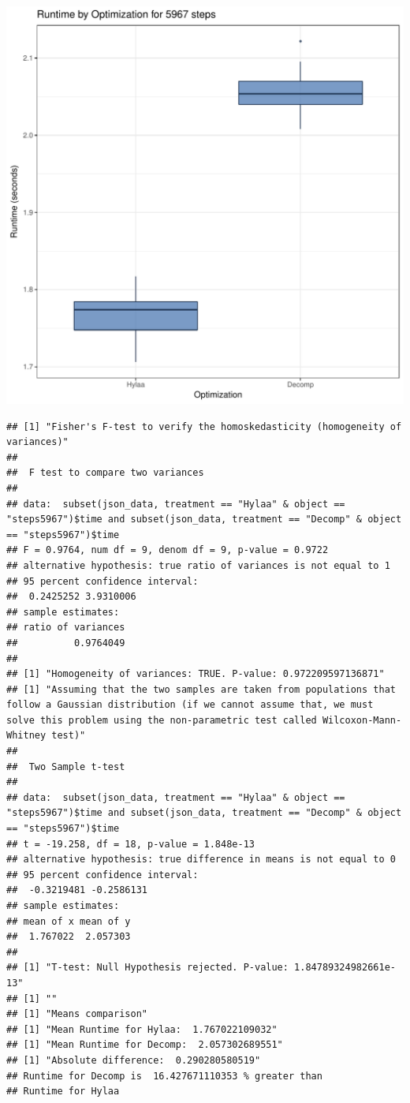 \documentclass{article}\usepackage[]{graphicx}\usepackage[]{color}
\makeatletter
\def\maxwidth{ %
  \ifdim\Gin@nat@width>\linewidth
    \linewidth
  \else
    \Gin@nat@width
  \fi
}
\newenvironment{kframe}{%
 \def\at@end@of@kframe{}%
 \ifinner\ifhmode%
  \def\at@end@of@kframe{\end{minipage}}%
  \begin{minipage}{\columnwidth}%
 \fi\fi%
 \def\FrameCommand##1{\hskip\@totalleftmargin \hskip-\fboxsep
 \colorbox{shadecolor}{##1}\hskip-\fboxsep
     \hskip-\linewidth \hskip-\@totalleftmargin \hskip\columnwidth}%
 \MakeFramed {\advance\hsize-\width
   \@totalleftmargin\z@ \linewidth\hsize
   \@setminipage}}%
 {\par\unskip\endMakeFramed%
 \at@end@of@kframe}
\newenvironment{knitrout}{}{} %
\makeatother
\begin{document}
\begin{knitrout}
\color{fgcolor}
\includegraphics[width=\maxwidth]{figure/RH2_steps5967-1} 
\begin{kframe}\begin{verbatim}
## [1] "Fisher's F-test to verify the homoskedasticity (homogeneity of variances)"
## 
## 	F test to compare two variances
## 
## data:  subset(json_data, treatment == "Hylaa" & object == "steps5967")$time and subset(json_data, treatment == "Decomp" & object == "steps5967")$time
## F = 0.9764, num df = 9, denom df = 9, p-value = 0.9722
## alternative hypothesis: true ratio of variances is not equal to 1
## 95 percent confidence interval:
##  0.2425252 3.9310006
## sample estimates:
## ratio of variances 
##          0.9764049 
## 
## [1] "Homogeneity of variances: TRUE. P-value: 0.972209597136871"
## [1] "Assuming that the two samples are taken from populations that follow a Gaussian distribution (if we cannot assume that, we must solve this problem using the non-parametric test called Wilcoxon-Mann-Whitney test)"
## 
## 	Two Sample t-test
## 
## data:  subset(json_data, treatment == "Hylaa" & object == "steps5967")$time and subset(json_data, treatment == "Decomp" & object == "steps5967")$time
## t = -19.258, df = 18, p-value = 1.848e-13
## alternative hypothesis: true difference in means is not equal to 0
## 95 percent confidence interval:
##  -0.3219481 -0.2586131
## sample estimates:
## mean of x mean of y 
##  1.767022  2.057303 
## 
## [1] "T-test: Null Hypothesis rejected. P-value: 1.84789324982661e-13"
## [1] ""
## [1] "Means comparison"
## [1] "Mean Runtime for Hylaa:  1.767022109032"
## [1] "Mean Runtime for Decomp:  2.057302689551"
## [1] "Absolute difference:  0.290280580519"
## Runtime for Decomp is  16.427671110353 % greater than 
## Runtime for Hylaa
\end{verbatim}
\end{kframe}
\end{knitrout}
\end{document}
